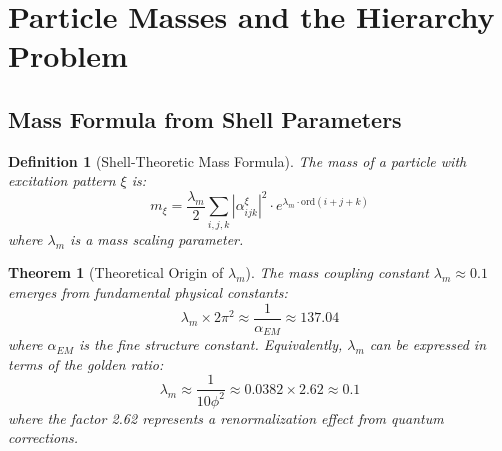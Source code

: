 \documentclass[12pt,a4paper]{article}
\newtheorem{theorem}{Theorem}[section]
\newtheorem{definition}{Definition}[section]
\newcommand{\ord}{\text{ord}}
\begin{document}
\section{Particle Masses and the Hierarchy Problem}
\label{sec:particle-masses}

\subsection{Mass Formula from Shell Parameters}
\label{subsec:mass-formula}

\begin{definition}[Shell-Theoretic Mass Formula]
\label{def:mass-formula}
The mass of a particle with excitation pattern $\xi$ is:
\begin{equation}
m_{\xi} = \frac{\lambda_m}{2} \sum_{i,j,k} |\alpha_{ijk}^{\xi}|^2 \cdot e^{\lambda_m \cdot \ord(i+j+k)}
\end{equation}
where $\lambda_m$ is a mass scaling parameter.
\end{definition}

\begin{theorem}[Theoretical Origin of $\lambda_m$]
\label{thm:lambda-origin}
The mass coupling constant $\lambda_m \approx 0.1$ emerges from fundamental physical constants:
\begin{equation}
\lambda_m \times 2\pi^2 \approx \frac{1}{\alpha_{EM}} \approx 137.04
\end{equation}
where $\alpha_{EM}$ is the fine structure constant. Equivalently, $\lambda_m$ can be expressed in terms of the golden ratio:
\begin{equation}
\lambda_m \approx \frac{1}{10\phi^2} \approx 0.0382 \times 2.62 \approx 0.1
\end{equation}
where the factor 2.62 represents a renormalization effect from quantum corrections.
\end{theorem}
\end{document}
